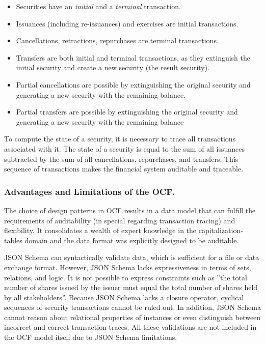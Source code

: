 \begin{itemize}
	\item Securities have an \textit{initial} and a \textit{terminal} transaction.
	\item Issuances (including re-issuances) and \glspl{exercise} are initial \glspl{transaction}.
	\item Cancellations, retractions, repurchases are terminal \glspl{transaction}.
	\item Transfers are both initial and terminal \glspl{transaction}, as they extinguish the initial \gls{security} and create a new \gls{security} (the result security).
	\item Partial cancellations are possible by extinguishing the original \gls{security} and generating a new \gls{security} with the remaining balance.
	\item Partial transfers are possible by extinguishing the original \gls{security} and generating a new \gls{security} with the remaining balance
\end{itemize}

To compute the state of a  \gls{security}, it is necessary to trace all transactions associated with it. The state of a \gls{security} is equal to the sum of all issuances subtracted by the sum of all cancellations, repurchases, and transfers. This sequence of transactions makes the financial system auditable and traceable.


\subsubsection{Advantages and Limitations of the OCF.}

The choice of design patterns in OCF results in a data model that can fulfill the requirements of auditability (in special regarding transaction tracing) and flexibility. It consolidates a wealth of expert knowledge in the \glspl{capitalization-table} domain and the data format was explicitly designed to be auditable.


JSON Schema can syntactically validate data, which is sufficient for a file or data exchange format. However, JSON Schema lacks expressiveness in terms of sets, relations, and logic. It is not possible to express constraints such as ''the total number of shares issued by the \gls{issuer} must equal the total number of shares held by all stakeholders''. Because JSON Schema lacks a closure operator, cyclical sequences of \gls{security} transactions cannot be ruled out. In addition, JSON Schema cannot reason about relational properties of instances or even distinguish between incorrect and correct transaction traces. All these validations are not included in the OCF model itself due to JSON Schema limitations.

